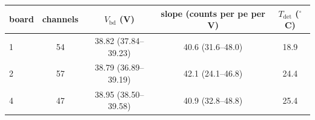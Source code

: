\begin{tabular}{lcccc}
\toprule
board & channels & $V_\mathrm{bd}$ (V) & slope (counts per pe per V) & $T_\mathrm{det}$ ($^\circ$C) \\
\midrule
1 & 54 & 38.82 (37.84--39.23) & 40.6 (31.6--48.0) & 18.9 \\
2 & 57 & 38.79 (36.89--39.19) & 42.1 (24.1--46.8) & 24.4 \\
4 & 47 & 38.95 (38.50--39.58) & 40.9 (32.8--48.8) & 25.4 \\
\bottomrule
\end{tabular}
